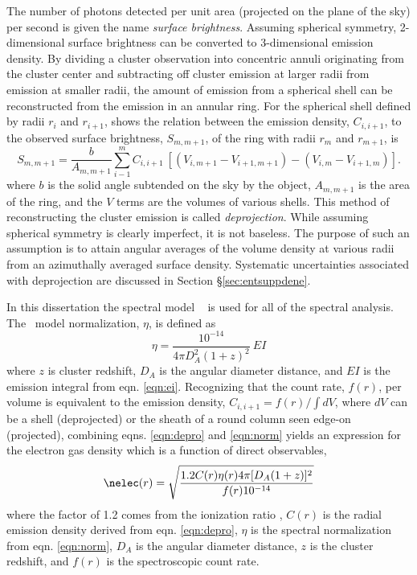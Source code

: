 The number of photons detected per unit area (projected on the plane
of the sky) per second is given the name {\it{surface brightness}}.
Assuming spherical symmetry, 2-dimensional surface brightness can be
converted to 3-dimensional emission density. By dividing a cluster
observation into concentric annuli originating from the cluster center
and subtracting off cluster emission at larger radii from emission at
smaller radii, the amount of emission from a spherical shell can be
reconstructed from the emission in an annular ring. For the spherical
shell defined by radii $r_i$ and $r_{i+1}$, \citet{kriss83} shows the
relation between the emission density, $C_{i,i+1}$, to the observed
surface brightness, $S_{m,m+1}$, of the ring with radii $r_m$ and
$r_{m+1}$, is
\begin{equation}
\label{eqn:depro}
S_{m,m+1} = \frac{b}{A_{m,m+1}}\sum_{i-1}^m C_{i,i+1}~[(V_{i,m+1}-V_{i+1,m+1})-(V_{i,m}-V_{i+1,m})].
\end{equation}
where $b$ is the solid angle subtended on the sky by the object,
$A_{m,m+1}$ is the area of the ring, and the $V$ terms are the volumes
of various shells. This method of reconstructing the cluster emission
is called {\it{deprojection}}. While assuming spherical symmetry is
clearly imperfect, it is not baseless. The purpose of such an
assumption is to attain angular averages of the volume density at
various radii from an azimuthally averaged surface density. Systematic
uncertainties associated with deprojection are discussed in Section
\S\ref{sec:entsuppdene}.

In this dissertation the spectral model \mekal\ \citep{mekal1, mekal2,
  mekal3} is used for all of the spectral analysis. The \mekal\ model
normalization, $\eta$, is defined as
\begin{equation}
\label{eqn:norm}
\eta = \frac{10^{-14}}{4\pi D_A^2 (1+z)^2}~EI
\end{equation}
where $z$ is cluster redshift, $D_A$ is the angular diameter distance,
and $EI$ is the emission integral from eqn. \ref{eqn:ei}. Recognizing
that the count rate, $f(r)$, per volume is equivalent to the emission
density, $C_{i,i+1} = f(r)/\int dV$, where $dV$ can be a shell
(deprojected) or the sheath of a round column seen edge-on
(projected), combining eqns. \ref{eqn:depro} and \ref{eqn:norm} yields
an expression for the electron gas density which is a function of
direct observables,
\begin{equation}
\label{eqn:dens}
\nelec(r) = \sqrt{\frac{1.2 C(r) \eta(r) 4 \pi [D_A(1+z)]^2}{f(r) 10^{-14}}}
\end{equation}
where the factor of 1.2 comes from the ionization ratio \np,
$C(r)$ is the radial emission density derived from
eqn. \ref{eqn:depro}, $\eta$ is the spectral normalization from
eqn. \ref{eqn:norm}, $D_A$ is the angular diameter distance, $z$ is
the cluster redshift, and $f(r)$ is the spectroscopic count rate.

